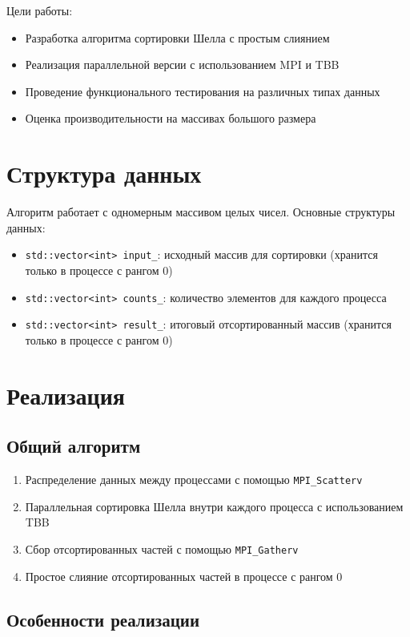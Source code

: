 \documentclass[12pt]{article}
\begin{document}
Цели работы:
\begin{itemize}
\item Разработка алгоритма сортировки Шелла с простым слиянием
\item Реализация параллельной версии с использованием MPI и TBB
\item Проведение функционального тестирования на различных типах данных
\item Оценка производительности на массивах большого размера
\end{itemize}

\section{Структура данных}
Алгоритм работает с одномерным массивом целых чисел. Основные структуры данных:
\begin{itemize}
\item \texttt{std::vector<int> input\_}: исходный массив для сортировки (хранится только в процессе с рангом 0)
\item \texttt{std::vector<int> counts\_}: количество элементов для каждого процесса
\item \texttt{std::vector<int> result\_}: итоговый отсортированный массив (хранится только в процессе с рангом 0)
\end{itemize}

\section{Реализация}
\subsection{Общий алгоритм}
\begin{enumerate}
\item Распределение данных между процессами с помощью \texttt{MPI\_Scatterv}
\item Параллельная сортировка Шелла внутри каждого процесса с использованием TBB
\item Сбор отсортированных частей с помощью \texttt{MPI\_Gatherv}
\item Простое слияние отсортированных частей в процессе с рангом 0
\end{enumerate}

\subsection{Особенности реализации}
\end{document}
